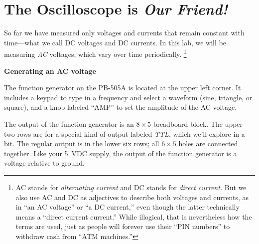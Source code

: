 \section{The Oscilloscope is \textit{Our Friend!}}
\label{lab_oscilloscope}


\bigskip


So far we have measured only voltages and currents that remain constant with time---what we call DC voltages and DC currents.  In this lab, we will be measuring \textit{AC} voltages, which vary over time periodically.%
\footnote{AC stands for \textit{alternating current} and DC stands for \textit{direct current.} But we also use AC and DC as adjectives to describe both voltages and currents, as in ``an AC voltage'' or ``a DC current,'' even though the latter technically means a ``direct current current.''  While illogical, that is nevertheless how the terms are used, just as people will forever use their ``PIN numbers'' to withdraw cash from ``ATM machines.''}

\textbf{Generating an AC voltage}


The function generator on the PB-505A is located at the upper left corner. It includes a keypad to type in a frequency and select a waveform (sine, triangle, or square), and a knob labeled ``AMP'' to set the amplitude of the AC voltage.  

The output of the function generator is an $8 \times 5$ breadboard block.  The upper two rows are for a special kind of output labeled \textit{TTL}, which we'll explore in a bit.  The regular output is in the lower six rows; all $6 \times 5$ holes are connected together.  Like your 5~VDC supply, the output of the function generator is a voltage relative to ground.

